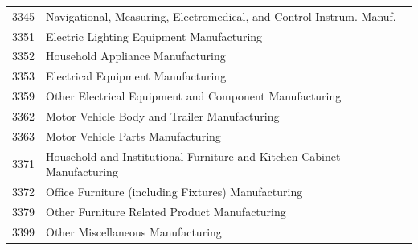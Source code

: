 \begin{spacing}{1}
\begin{longtable}{cl}
3345 &	Navigational, Measuring, Electromedical, and Control Instrum. Manuf. \\
3351 &	Electric Lighting Equipment Manufacturing \\
3352 &	Household Appliance Manufacturing \\
3353 &	Electrical Equipment Manufacturing \\
3359 &	Other Electrical Equipment and Component Manufacturing \\
3362 &	Motor Vehicle Body and Trailer Manufacturing \\
3363 &	Motor Vehicle Parts Manufacturing \\
3371 &	Household and Institutional Furniture and Kitchen Cabinet Manufacturing \\
3372 &	Office Furniture (including Fixtures) Manufacturing \\
3379 &	Other Furniture Related Product Manufacturing \\
3399 &	Other Miscellaneous Manufacturing \\
\end{longtable}
\end{spacing}
